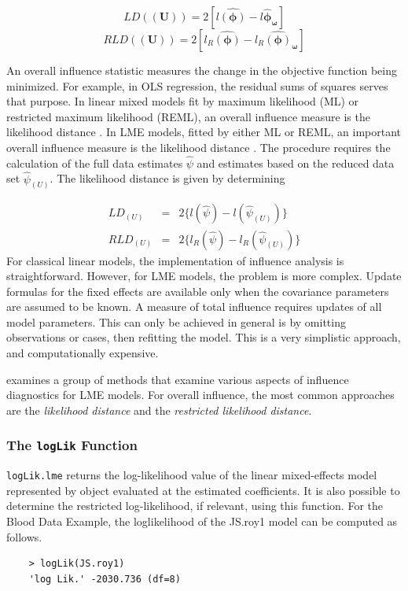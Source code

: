 \documentclass[12pt, a4paper]{report}
\theoremstyle{plain}
\theoremstyle{definition}
\theoremstyle{remark}
\begin{document}
\[  LD(\boldsymbol{(U)})= 2[l\boldsymbol{\hat{(\phi)}} - l\boldsymbol{\hat{\phi}_\omega} ] \]
\[  RLD(\boldsymbol{(U)})= 2[ l_R\boldsymbol{\hat{(\phi)}} - l_R\boldsymbol{\hat{(\phi)}_\omega} ] \]


An overall influence statistic measures the change in the objective function being minimized. For example, in
OLS regression, the residual sums of squares serves that purpose. In linear mixed models fit by
 maximum likelihood (ML) or  restricted maximum likelihood (REML), an overall influence measure is the  likelihood distance \citep{cook}. In LME models, fitted by either ML or REML, an important overall
influence measure is the likelihood distance \citep{cook82}. The  procedure requires the calculation of the full data estimates
$\hat{\psi}$ and estimates based on the reduced data set  $\hat{\psi}_{(U)}$. The likelihood distance is given by
determining


\begin{eqnarray}
LD_{(U)} &=& 2\{l(\hat{\psi}) - l( \hat{\psi}_{(U)}) \}\\
RLD_{(U)} &=& 2\{l_{R}(\hat{\psi}) - l_{R}(\hat{\psi}_{(U)})\}
\end{eqnarray}
For classical linear models, the implementation of influence analysis is straightforward.
However, for LME models, the problem is more complex. Update formulas for the fixed effects are available only when the covariance parameters are assumed to be known. A measure of total influence requires updates of all model parameters. This can only be achieved in general is by omitting observations or cases, then refitting the model. This is a very simplistic approach, and computationally expensive.

\citet{west} examines a group of methods that examine various aspects of influence diagnostics for LME models.
For overall influence, the most common approaches are the \textit{likelihood distance} and the \textit{restricted likelihood distance}.

\subsubsection{The \texttt{logLik} Function}
\texttt{logLik.lme} returns the log-likelihood value of the linear mixed-effects model represented by object evaluated at the estimated coefficients. It is also possible to determine the restricted log-likelihood, if relevant, using this function. For the Blood Data Example,  the loglikelihood of the JS.roy1 model can be computed as follows.
\begin{framed}
	\begin{verbatim}
	> logLik(JS.roy1)
	'log Lik.' -2030.736 (df=8)
	\end{verbatim}
\end{framed}
	
\end{document}
